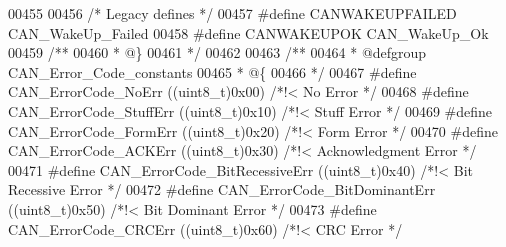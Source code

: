 \begin{DoxyCode}
00455 
00456 \textcolor{comment}{/* Legacy defines */}
00457 \textcolor{preprocessor}{#}\textcolor{preprocessor}{define} \textcolor{preprocessor}{CANWAKEUPFAILED}   CAN_WakeUp_Failed
00458 \textcolor{preprocessor}{#}\textcolor{preprocessor}{define} \textcolor{preprocessor}{CANWAKEUPOK}       CAN_WakeUp_Ok
00459 \textcolor{comment}{/**}
00460 \textcolor{comment}{  * @\}}
00461 \textcolor{comment}{  */}
00462 
00463 \textcolor{comment}{/**}
00464 \textcolor{comment}{  * @defgroup CAN\_Error\_Code\_constants}
00465 \textcolor{comment}{  * @\{}
00466 \textcolor{comment}{  */}
00467 \textcolor{preprocessor}{#}\textcolor{preprocessor}{define} \textcolor{preprocessor}{CAN\_ErrorCode\_NoErr}           \textcolor{preprocessor}{(}\textcolor{preprocessor}{(}\textcolor{preprocessor}{uint8\_t}\textcolor{preprocessor}{)}0x00\textcolor{preprocessor}{)} \textcolor{comment}{/*!< No Error */}
00468 \textcolor{preprocessor}{#}\textcolor{preprocessor}{define} \textcolor{preprocessor}{CAN\_ErrorCode\_StuffErr}        \textcolor{preprocessor}{(}\textcolor{preprocessor}{(}\textcolor{preprocessor}{uint8\_t}\textcolor{preprocessor}{)}0x10\textcolor{preprocessor}{)} \textcolor{comment}{/*!< Stuff Error */}
00469 \textcolor{preprocessor}{#}\textcolor{preprocessor}{define} \textcolor{preprocessor}{CAN\_ErrorCode\_FormErr}         \textcolor{preprocessor}{(}\textcolor{preprocessor}{(}\textcolor{preprocessor}{uint8\_t}\textcolor{preprocessor}{)}0x20\textcolor{preprocessor}{)} \textcolor{comment}{/*!< Form Error */}
00470 \textcolor{preprocessor}{#}\textcolor{preprocessor}{define} \textcolor{preprocessor}{CAN\_ErrorCode\_ACKErr}          \textcolor{preprocessor}{(}\textcolor{preprocessor}{(}\textcolor{preprocessor}{uint8\_t}\textcolor{preprocessor}{)}0x30\textcolor{preprocessor}{)} \textcolor{comment}{/*!< Acknowledgment Error */}
00471 \textcolor{preprocessor}{#}\textcolor{preprocessor}{define} \textcolor{preprocessor}{CAN\_ErrorCode\_BitRecessiveErr} \textcolor{preprocessor}{(}\textcolor{preprocessor}{(}\textcolor{preprocessor}{uint8\_t}\textcolor{preprocessor}{)}0x40\textcolor{preprocessor}{)} \textcolor{comment}{/*!< Bit Recessive Error */}
00472 \textcolor{preprocessor}{#}\textcolor{preprocessor}{define} \textcolor{preprocessor}{CAN\_ErrorCode\_BitDominantErr}  \textcolor{preprocessor}{(}\textcolor{preprocessor}{(}\textcolor{preprocessor}{uint8\_t}\textcolor{preprocessor}{)}0x50\textcolor{preprocessor}{)} \textcolor{comment}{/*!< Bit Dominant Error */}
00473 \textcolor{preprocessor}{#}\textcolor{preprocessor}{define} \textcolor{preprocessor}{CAN\_ErrorCode\_CRCErr}          \textcolor{preprocessor}{(}\textcolor{preprocessor}{(}\textcolor{preprocessor}{uint8\_t}\textcolor{preprocessor}{)}0x60\textcolor{preprocessor}{)} \textcolor{comment}{/*!< CRC Error  */}

\end{DoxyCode}

